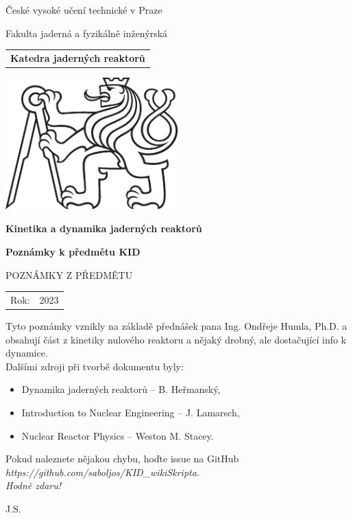 \documentclass[a4paper, 11pt]{article}
\newcommand{\logoCVUT}{\includegraphics[width = 0.5\textwidth]{img/symbol_cvut_konturova_verze_cb.pdf}}
\begin{document}
%
%

\thispagestyle{empty}

\begin{center}
	{\LARGE
		České vysoké učení technické v Praze \par
		Fakulta jaderná a fyzikálně inženýrská
	}
    \vspace{10mm}

    \begin{tabular}{c}
		\textbf{Katedra jaderných reaktorů} \\[3pt]
    \end{tabular}

   \vspace{10mm} \logoCVUT \vspace{15mm}

   {\huge \textbf{Kinetika a dynamika jaderných reaktorů}\par}
   \vspace{5mm}
   {\huge \textbf{Poznámky k předmětu KID}\par}

   \vspace{15mm}
   {\Large \MakeUppercase{Poznámky z předmětu}}

   \vfill
   {\large
    \begin{tabular}{ll}
    Rok: & 2023
    \end{tabular}
   }
\end{center}

\newpage
\thispagestyle{empty}

\vfill

\vspace{1em}
Tyto poznámky vznikly na základě přednášek pana Ing. Ondřeje Humla, Ph.D. a obsahují část z kinetiky nulového reaktoru a nějaký drobný, ale dostačující info k dynamice.\\

Dalšími zdroji při tvorbě dokumentu byly:

\begin{itemize}
    \item Dynamika jaderných reaktorů -- B. Heřmanský,
    \item Introduction to Nuclear Engineering -- J. Lamarsch,
    \item Nuclear Reactor Physics -- Weston M. Stacey.
\end{itemize}

Pokud naleznete nějakou chybu, hoďte issue na GitHub \it{https://github.com/saboljos/KID\_wikiSkripta}.\\

\rm Hodně zdaru!

\rm J.S.

\vspace{2em}

\clearpage{\pagestyle{empty}}



\newpage
\parskip=0pt
\begin{small}
\tableofcontents
\end{small}
\parskip=7pt
\newpage






\end{document}
